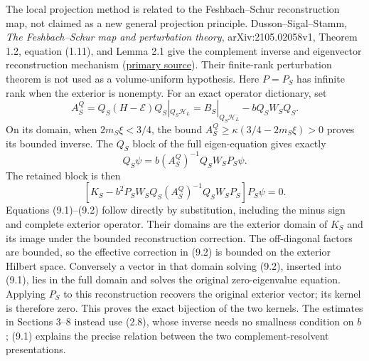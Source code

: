 \documentclass[
]{article}
\begin{document}
The local projection method is related to the Feshbach--Schur
reconstruction map, not claimed as a new general projection principle.
Dusson--Sigal--Stamm, \emph{The Feshbach--Schur map and perturbation
theory}, arXiv:2105.02058v1, Theorem 1.2, equation (1.11), and Lemma 2.1
give the complement inverse and eigenvector reconstruction mechanism
(\href{https://arxiv.org/abs/2105.02058}{primary source}). Their
finite-rank perturbation theorem is not used as a volume-uniform
hypothesis. Here \(P=P_S\) has infinite rank when the exterior is
nonempty. For an exact operator dictionary, set \[
A_S^Q=Q_S(H-\mathcal E)Q_S|_{Q_S\mathcal H_L}
 =B_S|_{Q_S\mathcal H_L}-bQ_SW_SQ_S.
\] On its domain, when \(2m_S\xi<3/4\), the bound
\(A_S^Q\ge\kappa(3/4-2m_S\xi)>0\) proves its bounded inverse. The
\(Q_S\) block of the full eigen-equation gives exactly \[
Q_S\psi=b(A_S^Q)^{-1}Q_SW_SP_S\psi.                            \tag{9.1}
\] The retained block is then \[
\left[K_S-b^2P_SW_SQ_S(A_S^Q)^{-1}Q_SW_SP_S\right]P_S\psi=0.   \tag{9.2}
\] Equations (9.1)--(9.2) follow directly by substitution, including the
minus sign and complete exterior operator. Their domains are the
exterior domain of \(K_S\) and its image under the bounded
reconstruction correction. The off-diagonal factors are bounded, so the
effective correction in (9.2) is bounded on the exterior Hilbert space.
Conversely a vector in that domain solving (9.2), inserted into (9.1),
lies in the full domain and solves the original zero-eigenvalue
equation. Applying \(P_S\) to this reconstruction recovers the original
exterior vector; its kernel is therefore zero. This proves the exact
bijection of the two kernels. The estimates in Sections 3--8 instead use
(2.8), whose inverse needs no smallness condition on \(b\); (9.1)
explains the precise relation between the two complement-resolvent
presentations.
\end{document}
